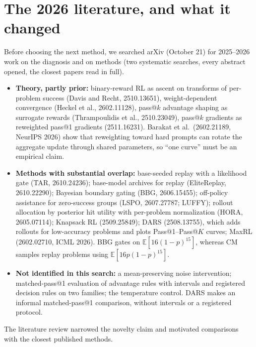 \documentclass[11pt]{article}
\newcommand{\E}{\mathbb{E}}
\begin{document}
\section{The 2026 literature, and what it changed}\label{sec:lit2026}
\begin{why}
Before choosing the next method, we searched arXiv (October 21) for 2025--2026 work on the diagnosis and on methods (two systematic searches, every abstract opened, the closest papers read in full).
\end{why}
\begin{found}
\begin{itemize}[leftmargin=*,itemsep=1pt]
\item \textbf{Theory, partly prior:} binary-reward RL as ascent on transforms of per-problem success (Davis and Recht, 2510.13651), weight-dependent convergence (Heckel et al., 2602.11128), pass@$k$ advantage shaping as surrogate rewards (Thrampoulidis et al., 2510.23049), pass@$k$ gradients as reweighted pass@1 gradients (2511.16231). Barakat et al.\ (2602.21189, NeurIPS 2026) show that reweighting toward hard prompts can rotate the aggregate update through shared parameters, so ``one curve'' must be an empirical claim.
\item \textbf{Methods with substantial overlap:} base-seeded replay with a likelihood gate (TAR, 2610.24236); base-model archives for replay (EliteReplay, 2610.22290); Bayesian boundary gating (BBG, 2606.15455); off-policy assistance for zero-success groups (LSPO, 2607.27787; LUFFY); rollout allocation by posterior hit utility with per-problem normalization (HORA, 2605.07114); Knapsack RL (2509.25849); DARS (2508.13755), which adds rollouts for low-accuracy problems and plots Pass@1--Pass@$K$ curves; MaxRL (2602.02710, ICML 2026). BBG gates on $\E[16(1-p)^{15}]$, whereas CM samples replay problems using $\E[16p(1-p)^{15}]$.
\item \textbf{Not identified in this search:} a mean-preserving noise intervention; matched-pass@1 evaluation of advantage rules with intervals and registered decision rules on two families; the temperature control. DARS makes an informal matched-pass@1 comparison, without intervals or a registered protocol.
\end{itemize}
The literature review narrowed the novelty claim and motivated comparisons with the closest published methods.
\end{found}

\end{document}
